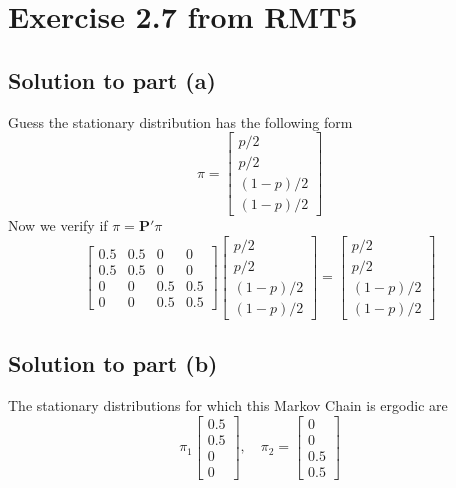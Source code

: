 \documentclass[11pt]{article}
\theoremstyle{definition}
\theoremstyle{boldtitle} %
\numberwithin{equation}{section}
\numberwithin{figure}{section}
\numberwithin{table}{section}
\begin{document}
\section*{Exercise 2.7 from RMT5}
\subsection*{Solution to part (a)}
Guess the stationary distribution has the following form
\[
\pi = 
\left[
\begin{matrix}
    p/2  \\ p/2 \\ (1-p)/2 \\ (1-p)/2
\end{matrix}
\right]
\]
Now we verify if $\pi = \mathbf{P}' \pi$
\[
\left[
\begin{matrix}
    0.5 & 0.5 & 0 & 0  \\ 0.5 & 0.5 & 0 & 0 \\ 0 & 0 & 0.5 & 0.5 \\ 0 & 0 & 0.5 & 0.5 
\end{matrix}
\right]
\left[
\begin{matrix}
    p/2  \\ p/2 \\ (1-p)/2 \\ (1-p)/2
\end{matrix}
\right]
= \left[
\begin{matrix}
    p/2  \\ p/2 \\ (1-p)/2 \\ (1-p)/2
\end{matrix}
\right]
\]

\subsection*{Solution to part (b)}
The stationary distributions for which this Markov Chain is ergodic are 
\[
\pi_1
\left[
\begin{matrix}
    0.5 \\ 0.5 \\ 0 \\ 0 
\end{matrix}
\right],
\quad 
\pi_2 = 
\left[
\begin{matrix}
    0 \\ 0 \\ 0.5 \\ 0.5
\end{matrix}
\right]
\]
\end{document}
